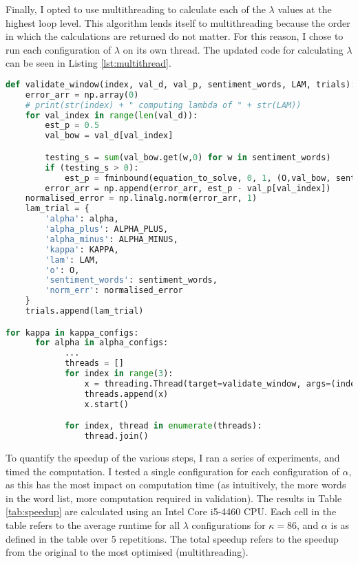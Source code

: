 \documentclass[ oneside,%
                    author={Joshua Felmeden},
                    degree={MEng},
                     title={Sentiment Analysis of Financial Headlines Based on Stock Returns},
                  subtitle={Research}]{dissertation}
\begin{document}
Finally, I opted to use multithreading to calculate each of the $\lambda$ values at the highest loop level. This algorithm lends itself to multithreading because the order in which the calculations are returned do not matter. For this reason, I chose to run each configuration of $\lambda$ on its own thread. The updated code for calculating $\lambda$ can be seen in Listing \ref{lst:multithread}.

\begin{lstlisting}[float={!htb},caption={Multithreadling Lambda},label={lst:multithread},language=Python]
def validate_window(index, val_d, val_p, sentiment_words, LAM, trials):
    error_arr = np.array(0)
    # print(str(index) + " computing lambda of " + str(LAM))
    for val_index in range(len(val_d)):
        est_p = 0.5
        val_bow = val_d[val_index]

        testing_s = sum(val_bow.get(w,0) for w in sentiment_words)
        if (testing_s > 0):
            est_p = fminbound(equation_to_solve, 0, 1, (O,val_bow, sentiment_words,testing_s,LAM))
        error_arr = np.append(error_arr, est_p - val_p[val_index])
    normalised_error = np.linalg.norm(error_arr, 1)
    lam_trial = {
        'alpha': alpha,
        'alpha_plus': ALPHA_PLUS,
        'alpha_minus': ALPHA_MINUS,
        'kappa': KAPPA,
        'lam': LAM,
        'o': O,
        'sentiment_words': sentiment_words,
        'norm_err': normalised_error
    }
    trials.append(lam_trial)

for kappa in kappa_configs:
      for alpha in alpha_configs:
            ...
            threads = []
            for index in range(3):
                x = threading.Thread(target=validate_window, args=(index,val_d, val_p, sentiment_words,lambda_configs[index],trials))
                threads.append(x)
                x.start()

            for index, thread in enumerate(threads):
                thread.join()
\end{lstlisting}

To quantify the speedup of the various steps, I ran a series of experiments, and timed the computation. I tested a single configuration for each configuration of $\alpha$, as this has the most impact on computation time (as intuitively, the more words in the word list, more computation required in validation). The results in Table \ref{tab:speedup} are calculated using an Intel Core i5-4460 CPU. Each cell in the table refers to the average runtime for all $\lambda$ configurations for $\kappa = 86$, and $\alpha$ is as defined in the table over 5 repetitions. The total speedup refers to the speedup from the original to the most optimised (multithreading).
\end{document}

